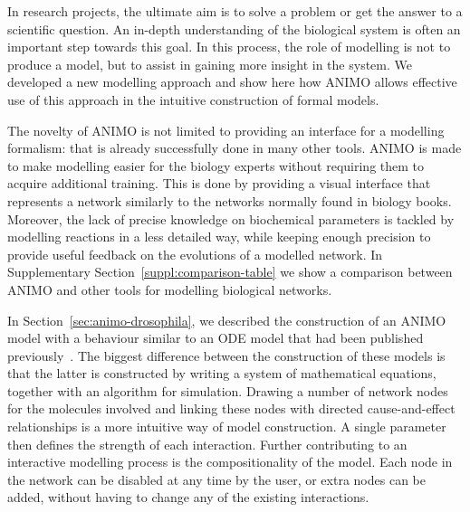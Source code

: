 In research projects, the ultimate aim is to solve a problem or get
the answer to a scientific question. An in-depth understanding of
the biological system is often an important step towards this goal.
In this process, the role of modelling is not to produce a model, but
to assist in gaining more insight in the system. We developed a new
modelling approach and show here how ANIMO allows effective use of
this approach in the intuitive construction of formal models.

The novelty of ANIMO is not limited to providing an interface
for a modelling formalism: that is already successfully done in many other tools.
ANIMO is made to make modelling easier for the biology experts
without requiring them to acquire additional training. This
is done by providing a visual interface that represents a network
similarly to the networks normally found in biology books.
Moreover, the lack of precise knowledge on biochemical parameters
is tackled by modelling reactions in a less detailed way,
while keeping enough precision to provide useful feedback on the
evolutions of a modelled network.
In Supplementary Section~\ref{suppl:comparison-table} we show a
comparison between ANIMO and other tools for modelling biological networks.

In Section~\ref{sec:animo-drosophila}, we described the construction of an ANIMO
model with a behaviour similar to an ODE model that had been
published previously~\citep{drosophila-ode-model}. The biggest
difference between the construction of these models is that the latter
is constructed by writing a system of mathematical equations, together
with an algorithm for simulation. Drawing a number of network
nodes for the molecules involved and linking these nodes with directed
cause-and-effect relationships is a more intuitive way of model
construction. A single parameter then defines the strength of each
interaction. Further contributing to an interactive modelling process
is the compositionality of the model. Each node in the network
can be disabled at any time by the user, or extra nodes can be added,
without having to change any of the existing interactions.

